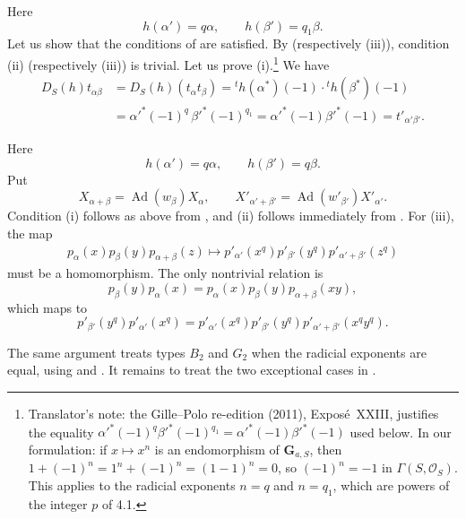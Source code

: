Here
\[
  h(\alpha')=q\alpha,\qquad h(\beta')=q_1\beta.
\]
Let us show that the conditions of  are satisfied. By
 (respectively (iii)), condition (ii) (respectively (iii))
is trivial. Let us prove (i).\footnote{Translator's note: the Gille--Polo re-edition (2011), Exposé~XXIII, justifies the
equality \(\alpha'^*(-1)^q\beta'^*(-1)^{q_1}=\alpha'^*(-1)\beta'^*(-1)\) used below. In our
formulation: if \(x\mapsto x^n\) is an endomorphism of \(\mathbf G_{a,S}\), then
\(1+(-1)^n=1^n+(-1)^n=(1-1)^n=0\), so \((-1)^n=-1\) in \(\Gamma(S,\mathcal O_S)\). This
applies to the radicial exponents \(n=q\) and \(n=q_1\), which are powers of the
integer \(p\) of 4.1.} We have
\[
\begin{aligned}
 D_S(h)t_{\alpha\beta}
  &=D_S(h)(t_\alpha t_\beta)
   ={}^th(\alpha^*)(-1)\cdot{}^th(\beta^*)(-1)\\
  &=\alpha'^*(-1)^q\,\beta'^*(-1)^{q_1}
   =\alpha'^*(-1)\beta'^*(-1)=t'_{\alpha'\beta'}.
\end{aligned}
\]

Here
\[
  h(\alpha')=q\alpha,\qquad h(\beta')=q\beta.
\]
Put
\[
  X_{\alpha+\beta}=\operatorname{Ad}(w_\beta)X_\alpha,
  \qquad
  X'_{\alpha'+\beta'}=\operatorname{Ad}(w'_{\beta'})X'_{\alpha'}.
\]
Condition (i) follows as above from , and (ii)
follows immediately from . For (iii), the map
\[
\begin{aligned}
 p_\alpha(x)p_\beta(y)p_{\alpha+\beta}(z)
 \longmapsto
 p'_{\alpha'}(x^q)p'_{\beta'}(y^q)p'_{\alpha'+\beta'}(z^q)
\end{aligned}
\]
must be a homomorphism. The only nontrivial relation is
\[
 p_\beta(y)p_\alpha(x)
  =p_\alpha(x)p_\beta(y)p_{\alpha+\beta}(xy),
\]
which maps to
\[
 p'_{\beta'}(y^q)p'_{\alpha'}(x^q)
  =p'_{\alpha'}(x^q)p'_{\beta'}(y^q)
    p'_{\alpha'+\beta'}(x^qy^q).
\]

The same argument treats types \(B_2\) and \(G_2\) when the
radicial exponents are equal, using  and .
It remains to treat the two exceptional cases in .

